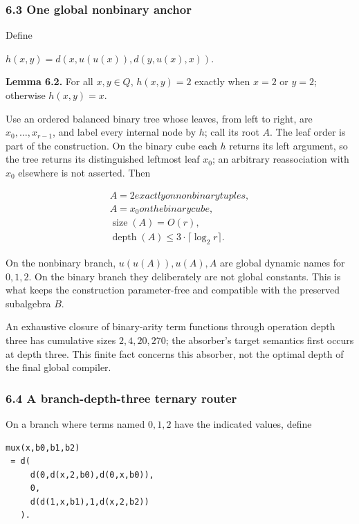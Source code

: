 \documentclass[
  11pt,
]{article}
\theoremstyle{definition}
\theoremstyle{remark}
\begin{document}
\hypertarget{one-global-nonbinary-anchor}{%
\subsubsection{6.3 One global nonbinary
anchor}\label{one-global-nonbinary-anchor}}

Define

\(h(x,y)=d(x,u(u(x)),d(y,u(x),x))\).

\textbf{Lemma 6.2.} For all \(x,y \in Q\), \(h(x,y)=2\) exactly when
\(x=2\) or \(y=2\); otherwise \(h(x,y)=x\).

Use an ordered balanced binary tree whose leaves, from left to right,
are \(x_0,\ldots ,x_{r-1}\), and label every internal node by \(h\);
call its root \(A\). The leaf order is part of the construction. On the
binary cube each \(h\) returns its left argument, so the tree returns
its distinguished leftmost leaf \(x_0\); an arbitrary reassociation with
\(x_0\) elsewhere is not asserted. Then

\[
\begin{aligned}
A=2 exactly on nonbinary tuples, \\
A=x_0 on the binary cube, \\
\operatorname{size}(A)=O(r), \\
\operatorname{depth}(A)\le 3\mathbin{\cdot}\lceil \log_2 r \rceil.
\end{aligned}
\]

On the nonbinary branch, \(u(u(A)),u(A),A\) are global dynamic names for
\(0,1,2\). On the binary branch they deliberately are not global
constants. This is what keeps the construction parameter-free and
compatible with the preserved subalgebra \(B\).

An exhaustive closure of binary-arity term functions through operation
depth three has cumulative sizes \(2,4,20,270\); the absorber's target
semantics first occurs at depth three. This finite fact concerns this
absorber, not the optimal depth of the final global compiler.

\hypertarget{a-branch-depth-three-ternary-router}{%
\subsubsection{6.4 A branch-depth-three ternary
router}\label{a-branch-depth-three-ternary-router}}

On a branch where terms named \(0,1,2\) have the indicated values,
define

\begin{lstlisting}
mux(x,b0,b1,b2)
 = d(
     d(0,d(x,2,b0),d(0,x,b0)),
     0,
     d(d(1,x,b1),1,d(x,2,b2))
   ).
\end{lstlisting}
\end{document}
